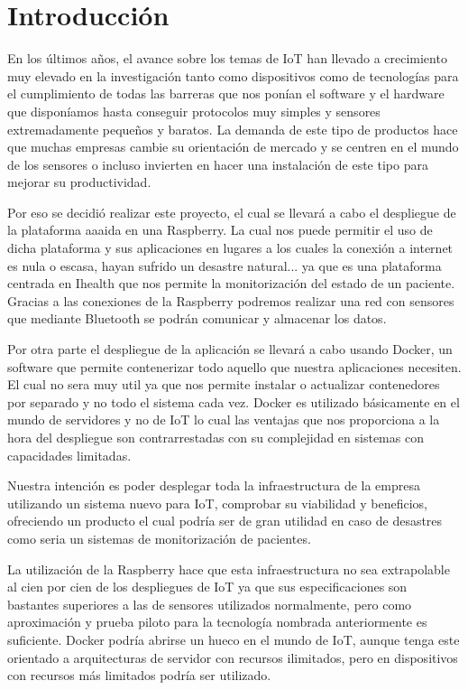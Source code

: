 \cleardoublepage
{}
\chapter*{Introducción}
En los últimos años, el avance sobre los temas de IoT han llevado a crecimiento muy elevado en la investigación tanto como dispositivos como de tecnologías para el cumplimiento de todas las barreras que nos ponían el software y el hardware que disponíamos hasta conseguir protocolos muy simples y sensores extremadamente pequeños y baratos. La demanda de este tipo de productos hace que muchas empresas cambie su orientación de mercado y se centren en el mundo de los sensores o incluso invierten en hacer una instalación de este tipo para mejorar su productividad. 

Por eso se decidió realizar este proyecto, el cual se llevará a cabo el despliegue de la plataforma aaaida en una Raspberry. La cual nos puede permitir el uso de dicha plataforma y sus aplicaciones en lugares a los cuales la conexión a internet es nula o escasa, hayan sufrido un desastre natural... ya que es una plataforma centrada en Ihealth que nos permite la monitorización del estado de un paciente.
Gracias a las conexiones de la Raspberry podremos realizar una red con sensores que mediante Bluetooth se podrán comunicar y almacenar los datos. 

Por otra parte el despliegue de la aplicación se llevará a cabo usando Docker, un software que permite contenerizar todo aquello que nuestra aplicaciones necesiten. El cual no sera muy util ya que nos permite instalar o actualizar contenedores por separado y no todo el sistema cada vez. Docker es utilizado básicamente en el mundo de servidores y no de IoT lo cual las ventajas que nos proporciona a la hora del despliegue son contrarrestadas con su complejidad en sistemas con capacidades limitadas.

Nuestra intención es poder desplegar toda la infraestructura de la empresa utilizando un sistema nuevo para IoT, comprobar su viabilidad y beneficios, ofreciendo un producto el cual podría ser de gran utilidad en caso de desastres como seria un sistemas de monitorización de pacientes. 

La utilización de la Raspberry hace que esta infraestructura no sea extrapolable al cien por cien de los despliegues de IoT ya que sus especificaciones son bastantes superiores a las de sensores utilizados normalmente, pero como aproximación y prueba piloto para  la tecnología nombrada anteriormente es suficiente. Docker podría abrirse un hueco en el mundo de IoT, aunque tenga este orientado a arquitecturas de servidor con recursos ilimitados, pero en dispositivos con recursos más limitados podría ser utilizado.  
